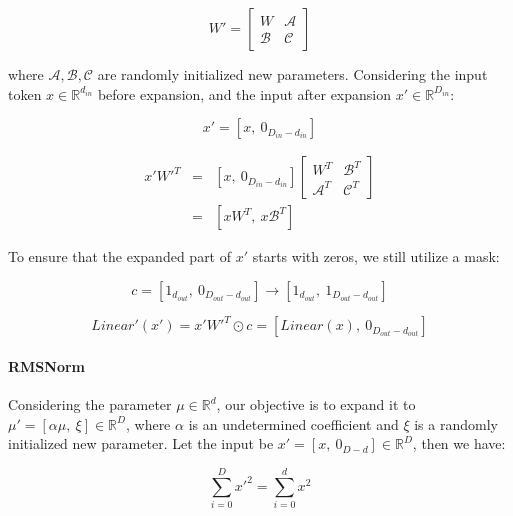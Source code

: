 \documentclass{article}
\begin{document}
\begin{equation}
W' = 
\begin{bmatrix}
    W & \mathcal{A} \\
    \mathcal{B} & \mathcal{C}
\end{bmatrix}
\end{equation}

where $\mathcal{A}, \mathcal{B}, \mathcal{C}$ are randomly initialized new parameters. Considering the input token $x \in \mathbb{R}^{d_{in}}$ before expansion, and the input after expansion $x' \in \mathbb{R}^{D_{in}}$:

\begin{equation}
    x' = [x,\ 0_{D_{in}-d_{in}}]
\end{equation}

\begin{eqnarray}
    x'W'^T &=& [x,\ 0_{D_{in}-d_{in}}] \begin{bmatrix}
    W^T & \mathcal{B}^T \\
    \mathcal{A}^T & \mathcal{C}^T
\end{bmatrix} \\
    &=& [xW^T,\ x\mathcal{B}^T]
\end{eqnarray}


To ensure that the expanded part of $x'$ starts with zeros, we still utilize a mask:

\begin{equation}
    c = [1_{d_{out}},\ 0_{D_{out}-d_{out}}] \rightarrow [1_{d_{out}},\ 1_{D_{out}-d_{out}}]
\end{equation}

\begin{equation}
    Linear'(x') = x'W'^T \odot c = [Linear(x),\ 0_{D_{out}-d_{out}}]
\end{equation}

\paragraph{RMSNorm}\label{pa:msg_rms} Considering the parameter $\mu \in \mathbb{R}^d$, our objective is to expand it to $\mu' = [\alpha \mu,\ \xi] \in \mathbb{R}^D$, where $\alpha$ is an undetermined coefficient and $\xi$ is a randomly initialized new parameter. Let the input be $x' = [x,\ 0_{D-d}] \in \mathbb{R}^D$, then we have:

\begin{equation}
    \sum_{i=0}^Dx'^2 = \sum_{i=0}^dx^2
\end{equation}
\end{document}
